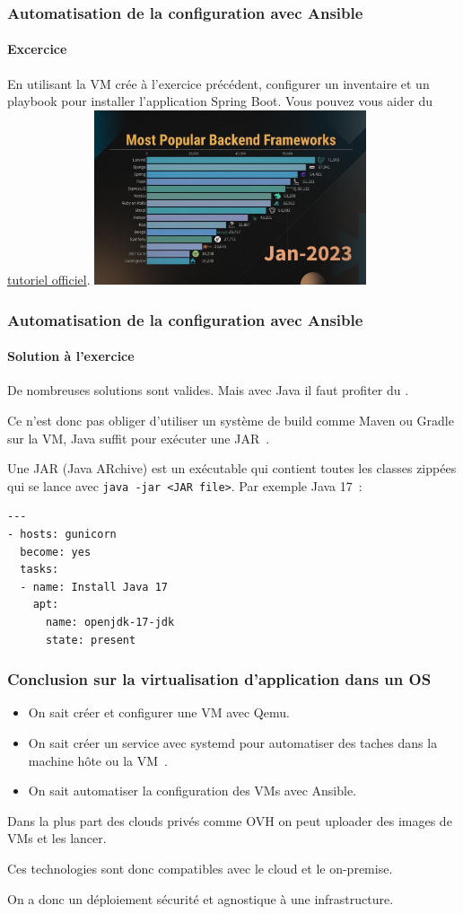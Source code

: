 \documentclass{beamer}
\begin{document}
    \begin{frame}
        \transdissolve
        \frametitle{Automatisation de la configuration avec Ansible}
        \framesubtitle{Excercice}
        En utilisant la VM crée à l'exercice précédent, configurer un inventaire et un playbook pour installer l'application Spring Boot.
        \bigbreak
        Vous pouvez vous aider du \href{https://spring.io/guides/gs/spring-boot}{tutoriel officiel}.
        \bigbreak
        \centering
        \includegraphics[width=8cm]{image/most-popular-backend.jpg}
    \end{frame}

    \begin{frame}[fragile]
        \transdissolve
        \frametitle{Automatisation de la configuration avec Ansible}
        \framesubtitle{Solution à l'exercice}
        De nombreuses solutions sont valides.
        Mais avec Java il faut profiter du .

        Ce n'est donc pas obliger d'utiliser un système de build comme Maven ou Gradle sur la VM, Java suffit pour exécuter une JAR~.

        Une JAR (Java ARchive) est un exécutable qui contient toutes les classes zippées qui se lance avec \lstinline{java -jar <JAR file>}.
        \bigbreak
        Par exemple Java 17~:
        \begin{lstlisting}
---
- hosts: gunicorn
  become: yes
  tasks:
  - name: Install Java 17
    apt:
      name: openjdk-17-jdk
      state: present
        \end{lstlisting}
    \end{frame}


    \begin{frame}
        \transdissolve
        \frametitle{Conclusion sur la virtualisation d'application dans un OS}
        \begin{itemize}
            \item On sait créer et configurer une VM avec Qemu.
            \item On sait créer un service avec systemd pour automatiser des taches dans la machine hôte ou la VM~.
            \item On sait automatiser la configuration des VMs avec Ansible.
        \end{itemize}
        \bigbreak
        Dans la plus part des clouds privés comme OVH on peut uploader des images de VMs et les lancer.

        Ces technologies sont donc compatibles avec le cloud et le on-premise.

        On a donc un déploiement sécurité et agnostique à une infrastructure.
    \end{frame}
\end{document}
